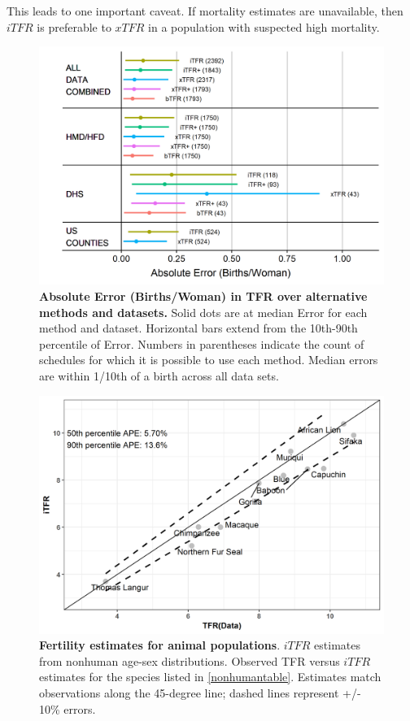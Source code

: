 \documentclass[12pt]{article}
\begin{document}
This leads to one important caveat. If mortality estimates are
unavailable, then \(iTFR\) is preferable to \(xTFR\) in a population
with suspected high mortality.

\begin{figure}
\centering
\includegraphics{manuscript_files/figure-latex/plot-comparisons-over-all-data-1.png}
\caption{\textbf{Absolute Error (Births/Woman) in TFR over alternative
methods and datasets.} Solid dots are at median Error for each method
and dataset. Horizontal bars extend from the 10th-90th percentile of
Error. Numbers in parentheses indicate the count of schedules for which
it is possible to use each method. Median errors are within 1/10th of a
birth across all data sets. \label{comparison}}
\end{figure}

\begin{figure}

{\centering \includegraphics[width=0.6\linewidth]{manuscript_files/figure-latex/plot-nonhuman-estimates-1} 

}

\caption{\textbf{Fertility estimates for animal populations}. $iTFR$ estimates from nonhuman age-sex distributions. Observed TFR versus $iTFR$ estimates for the species listed in \autoref{nonhumantable}. Estimates match observations along the 45-degree line; dashed lines represent +/- 10\% errors.\label{primates}}\label{fig:plot-nonhuman-estimates}
\end{figure}
\end{document}
